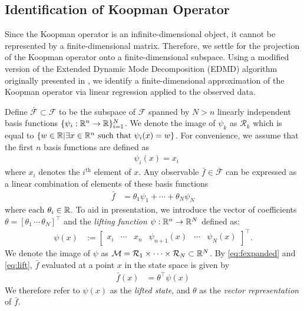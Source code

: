 \subsection{Identification of Koopman Operator}
\label{sec:koopid}

Since the Koopman operator is an infinite-dimensional object, it cannot be represented by a finite-dimensional matrix. 
Therefore, we settle for the projection of the Koopman operator onto a finite-dimensional subspace.
Using a modified version of the Extended Dynamic Mode Decomposition (EDMD) algorithm \cite{williams2015data} originally presented in \cite{mauroy2016linear,mauroy2017koopman}, we identify a finite-dimensional approximation of the Koopman operator via linear regression applied to the observed data.

Define ${\bar{\mathcal{F}} \subset \mathcal{F}}$ to be the subspace of $\mathcal{F}$ spanned by ${N>n}$ linearly independent basis functions 
${ \{ \psi_i : \mathbb{R}^n \to \mathbb{R} \}_{i=1}^N}$.
We denote the image of $\psi_k$ as $ \mathcal{R}_k$ which is equal to ${ \{ w \in \mathbb{R} | \exists x \in \mathbb{R}^n \text{ such that } \psi_i(x) = w  \} }$.
For convenience, we assume that the first $n$ basis functions are defined as
\begin{align}
    &\psi_i(x) = x_i
    \label{eq:xinpsi}
\end{align}
where $x_i$ denotes the $i^{\text{th}}$ element of $x$.
Any observable $\bar{f} \in \bar{\mathcal{F}}$ can be expressed as a linear combination of elements of these basis functions
\begin{align}
    \bar{f} &= \theta_1 \psi_1 + \cdots + \theta_N \psi_N
    \label{eq:fexpanded}
\end{align}
where each $\theta_i \in \mathbb{R}$.
To aid in presentation, we introduce the vector of coefficients ${\theta = [ \theta_1 \,  \cdots \, \theta_N ]^\top}$ and the \emph{lifting function} ${\psi : \mathbb{R}^n \to \mathbb{R}^N}$ defined as:
\begin{align}
    \psi(x) &:= \begin{bmatrix} x_i & \cdots & x_n & \psi_{n+1} (x) & \cdots & \psi_N (x) \end{bmatrix}^\top.
    \label{eq:lift}
\end{align}
We denote the image of $\psi$ as $\mathcal{M} = \mathcal{R}_1 \times \cdots \times \mathcal{R}_N \subset \mathbb{R}^N$.
By \eqref{eq:fexpanded} and \eqref{eq:lift}, $\bar{f}$ evaluated at a point $x$ in the state space is given by
\begin{align}
    \bar{f}(x) &= \theta^\top \psi (x)
    \label{eq:fvec}
\end{align}
We therefore refer to $\psi(x)$ as the \emph{lifted state}, and $\theta$ as the \emph{vector representation} of $\bar{f}$.

